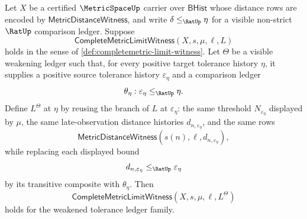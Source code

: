 \begin{theorem}
\label{thm:completemetric-limit-witness-tolerance-weakening}
Let $X$ be a certified $\MetricSpaceUp$ carrier over $\mathsf{BHist}$ whose
distance rows are encoded by $\mathsf{MetricDistanceWitness}$, and write
$\delta\le_{\RatUp}\eta$ for a visible non-strict $\RatUp$ comparison ledger.
Suppose
$$
\mathsf{CompleteMetricLimitWitness}(X,s,\mu,\ell,L)
$$
holds in the sense of \autoref{def:completemetric-limit-witness}. Let
$\Theta$ be a visible weakening ledger such that, for every positive target
tolerance history $\eta$, it supplies a positive source tolerance history
$\varepsilon_\eta$ and a comparison ledger
$$
\theta_\eta:\varepsilon_\eta\le_{\RatUp}\eta.
$$
Define $L^\Theta$ at $\eta$ by reusing the branch of $L$ at
$\varepsilon_\eta$: the same threshold $N_{\varepsilon_\eta}$ displayed by
$\mu$, the same late-observation distance histories $d_{n,\varepsilon_\eta}$,
and the same rows
$$
\mathsf{MetricDistanceWitness}(s(n),\ell,d_{n,\varepsilon_\eta}),
$$
while replacing each displayed bound
$$
d_{n,\varepsilon_\eta}\le_{\RatUp}\varepsilon_\eta
$$
by its transitive composite with $\theta_\eta$. Then
$$
\mathsf{CompleteMetricLimitWitness}(X,s,\mu,\ell,L^\Theta)
$$
holds for the weakened tolerance ledger family.
\end{theorem}
